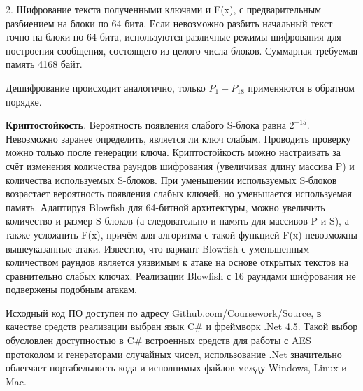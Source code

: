 2. Шифрование текста полученными ключами и F(x), с предварительным разбиением на блоки по 64 бита. Если невозможно разбить начальный текст точно на блоки по 64 бита, используются различные режимы шифрования для построения сообщения, состоящего из целого числа блоков. Суммарная требуемая память 4168 байт.

Дешифрование происходит аналогично, только  $ P_{1}-P_{18}  $ применяются в обратном порядке. 

\textbf{Криптостойкость}. Вероятность появления слабого S-блока равна   $ 2^{-15} $. Невозможно заранее определить, является ли ключ слабым. Проводить проверку можно только после генерации ключа.  Криптостойкость можно настраивать за счёт изменения количества раундов шифрования (увеличивая длину массива P) и количества используемых S-блоков. При уменьшении используемых S-блоков возрастает вероятность появления слабых ключей, но уменьшается используемая память. Адаптируя Blowfish для 64-битной архитектуры, можно увеличить количество и размер S-блоков (а следовательно и память для массивов P и S), а также усложнить F(x), причём для алгоритма с такой функцией F(x) невозможны вышеуказанные атаки. Известно, что вариант Blowfish с уменьшенным количеством раундов является уязвимым к атаке на основе открытых текстов на сравнительно слабых ключах. Реализации Blowfish с 16 раундами шифрования не подвержены подобным атакам. \cite{BF2}

Исходный код ПО доступен по адресу Github.com/Coursework/Source, в качестве средств реализации выбран язык C\# и фреймворк .Net 4.5. Такой выбор обусловлен доступностью в C\# встроенных средств для работы с AES протоколом и генераторами случайных чисел, использование .Net значительно облегчает портабельность кода и исполнимых файлов между Windows, Linux и Mac.
\newpage